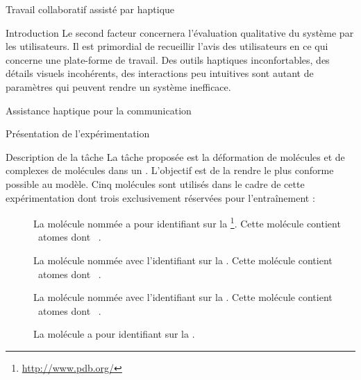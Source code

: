 \documentclass[myfrancais]{mythesis}
\begin{document}
\begin{mychapter}{Travail collaboratif assisté par haptique}
\begin{mysection}{Introduction}
			Le second facteur concernera l'évaluation qualitative du système par les utilisateurs.
			Il est primordial de recueillir l'avis des utilisateurs en ce qui concerne une plate-forme de travail.
			Des outils haptiques inconfortables, des détails visuels incohérents, des interactions peu intuitives sont autant de paramètres qui peuvent rendre un système inefficace.
		\end{mysection}
		\begin{mysection}{Assistance haptique pour la communication}
		\end{mysection}
		\begin{mysection}{Présentation de l'expérimentation}
			\begin{mysubsection}{Description de la tâche}
				La tâche proposée est la déformation de molécules et de complexes de molécules dans un .
				L'objectif est de la rendre le plus conforme possible au modèle.
				Cinq molécules sont utilisés dans le cadre de cette expérimentation dont trois exclusivement réservées pour l'entraînement :
				\begin{description}
					\item[\myTRPCAGE]
						La molécule nommée \myTRPCAGE {} a pour identifiant \myPDB {} sur la \myPDBbase\footnote{\url{http://www.pdb.org/}}.
						Cette molécule contient ~atomes dont ~.
					\item[\myPrion]
						La molécule nommée \myPrion {} avec l'identifiant \myPDB {} sur la \myPDBbase\footnotemark[\value{footnote}].
						Cette molécule contient ~atomes dont ~.
					\item[\myUbiquitin]
						La molécule nommée \myUbiquitin {} avec l'identifiant \myPDB {} sur la \myPDBbase\footnotemark[\value{footnote}].
						Cette molécule contient ~atomes dont ~.
					\item[\myTRPZIPPER]
						La molécule \myTRPZIPPER {} a pour identifiant \myPDB {} sur la \myPDBbase\footnotemark[\value{footnote}].

\end{description}
\end{mysubsection}
\end{mysection}
\end{mychapter}
\end{document}
